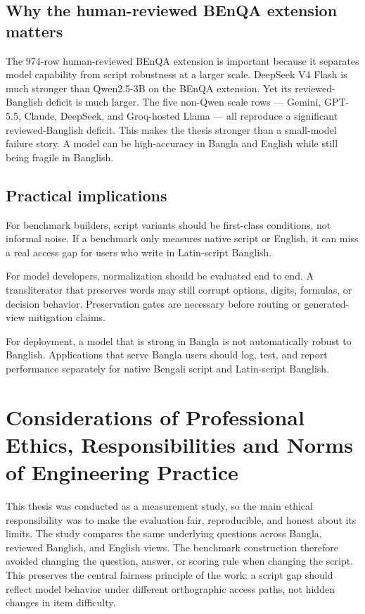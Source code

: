 \subsection{Why the human-reviewed BEnQA extension matters}

The 974-row human-reviewed BEnQA extension is important because it separates model capability from script robustness at a larger scale. DeepSeek V4 Flash is much stronger than Qwen2.5-3B on the BEnQA extension. Yet its reviewed-Banglish deficit is much larger. The five non-Qwen scale rows --- Gemini, GPT-5.5, Claude, DeepSeek, and Groq-hosted Llama --- all reproduce a significant reviewed-Banglish deficit. This makes the thesis stronger than a small-model failure story. A model can be high-accuracy in Bangla and English while still being fragile in Banglish.

\subsection{Practical implications}

For benchmark builders, script variants should be first-class conditions, not informal noise. If a benchmark only measures native script or English, it can miss a real access gap for users who write in Latin-script Banglish.

For model developers, normalization should be evaluated end to end. A transliterator that preserves words may still corrupt options, digits, formulas, or decision behavior. Preservation gates are necessary before routing or generated-view mitigation claims.

For deployment, a model that is strong in Bangla is not automatically robust to Banglish. Applications that serve Bangla users should log, test, and report performance separately for native Bengali script and Latin-script Banglish.

\section{Considerations of Professional Ethics, Responsibilities and Norms of Engineering Practice}

This thesis was conducted as a measurement study, so the main ethical responsibility was to make the evaluation fair, reproducible, and honest about its limits. The study compares the same underlying questions across Bangla, reviewed Banglish, and English views. The benchmark construction therefore avoided changing the question, answer, or scoring rule when changing the script. This preserves the central fairness principle of the work: a script gap should reflect model behavior under different orthographic access paths, not hidden changes in item difficulty.

